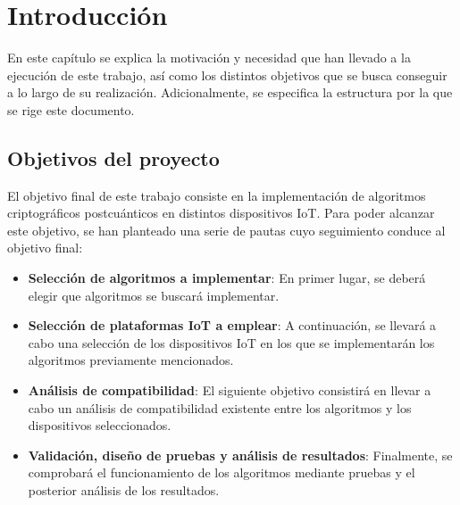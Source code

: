 % 
% 
% 
% 
% 
% 
% 
% 

\chapter{Introducción}\label{cha:introduccion}

En este capítulo se explica la motivación y necesidad que han llevado a la ejecución de este trabajo, así como los distintos objetivos que se busca conseguir a lo largo de su realización.
Adicionalmente, se especifica la estructura por la que se rige este documento.


\section{Objetivos del proyecto}\label{sec:objetivos}

El objetivo final de este trabajo consiste en la implementación de algoritmos criptográficos postcuánticos en distintos dispositivos \ac{IoT}.
Para poder alcanzar este objetivo, se han planteado una serie de pautas cuyo seguimiento conduce al objetivo final:

\begin{itemize}
    \item \textbf{Selección de algoritmos a implementar}: En primer lugar, se deberá elegir que algoritmos se buscará implementar.
    \item \textbf{Selección de plataformas \ac{IoT} a emplear}: A continuación, se llevará a cabo una selección de los dispositivos \ac{IoT} en los que se implementarán los algoritmos previamente mencionados.
    \item \textbf{Análisis de compatibilidad}: El siguiente objetivo consistirá en llevar a cabo un análisis de compatibilidad existente entre los algoritmos y los dispositivos seleccionados.
    \item \textbf{Validación, diseño de pruebas y análisis de resultados}: Finalmente, se comprobará el funcionamiento de los algoritmos mediante pruebas y el posterior análisis de los resultados.
\end{itemize}


